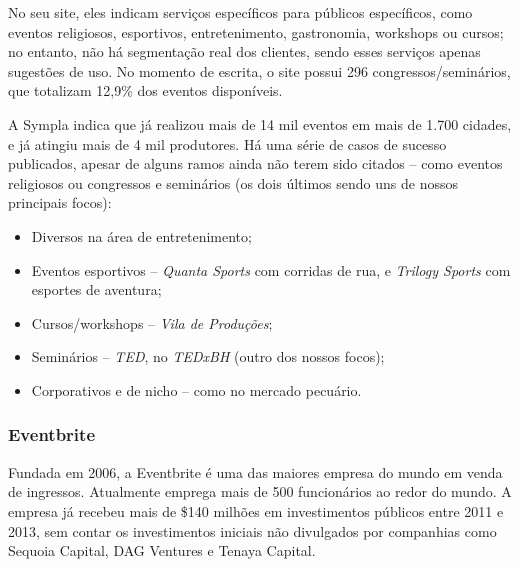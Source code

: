 \documentclass[12pt,a4paper,twoside,hyphens,english,brazil]{abntex2}
\begin{document}
No seu site, eles indicam serviços específicos para públicos específicos, como eventos religiosos, esportivos, entretenimento, gastronomia, workshops ou cursos; no entanto, não há segmentação real dos clientes, sendo esses serviços apenas sugestões de uso. No momento de escrita, o site possui 296 congressos/seminários, que totalizam 12,9\% dos eventos disponíveis.

A Sympla indica que já realizou mais de 14 mil eventos em mais de 1.700 cidades, e já atingiu mais de 4 mil produtores. Há uma série de casos de sucesso publicados\cite{sympla-cases}, apesar de alguns ramos ainda não terem sido citados -- como eventos religiosos ou congressos e seminários (os dois últimos sendo uns de nossos principais focos):
\begin{itemize}[itemsep=-1ex]
	\item Diversos na área de entretenimento;
	\item Eventos esportivos -- \emph{Quanta Sports} com corridas de rua, e \emph{Trilogy Sports} com esportes de aventura;
	\item Cursos/workshops -- \emph{Vila de Produções};
	\item Seminários -- \emph{TED}\footnotemark, no \emph{TEDxBH} (outro dos nossos focos);
	\item Corporativos e de nicho -- como no mercado pecuário.
\end{itemize}

\subsubsection*{Eventbrite}
Fundada em 2006, a Eventbrite é uma das maiores empresa do mundo em venda de ingressos. Atualmente emprega mais de 500 funcionários ao redor do mundo. A empresa já recebeu mais de \$140 milhões em investimentos públicos entre 2011 e 2013, sem contar os investimentos iniciais não divulgados por companhias como Sequoia Capital, DAG Ventures e Tenaya Capital. \cite{eventbrite-wiki}
\end{document}
